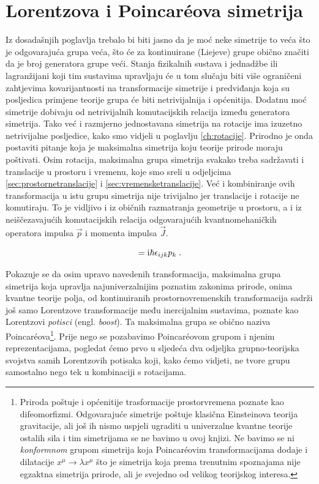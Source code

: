 
\chapter{Lorentzova i Poincar\'{e}ova simetrija}

Iz dosadašnjih poglavlja trebalo bi biti jasno da je moć
neke simetrije to veća što je odgovarajuća grupa veća, što
će za kontinuirane (Liejeve) grupe obično značiti da je broj generatora
grupe veći. Stanja fizikalnih sustava i jednadžbe ili lagranžijani
koji tim sustavima upravljaju
će u tom slučaju biti više ograničeni zahtjevima kovarijantnosti
na transformacije simetrije i predviđanja koja su posljedica
primjene teorije grupa će biti netrivijalnija i općenitija.
Dodatnu moć simetrije dobivaju od netrivijalnih komutacijskih
relacija između generatora simetrija.
Tako već i razmjerno jednostavana simetrija na rotacije ima izuzetno
netrivijalne posljedice, kako smo vidjeli u poglavlju \ref{ch:rotacije}.
Prirodno je onda postaviti pitanje koja je maksimalna
simetrija koju teorije prirode moraju poštivati. Osim rotacija,
maksimalna grupa simetrija svakako treba sadržavati i translacije
u prostoru i vremenu, koje smo sreli u odjeljcima
\ref{sec:prostornetranslacije} i \ref{sec:vremensketranslacije}.
Već i kombiniranje ovih transformacija u istu grupu simetrija
nije trivijalno jer translacije i rotacije ne komutiraju. To je
vidljivo i iz običnih razmatranja geometrije u prostoru, a i iz 
neiščezavajućih komutacijskih relacija odgovarajućih
kvantnomehaničkih operatora impulsa $\vec{p}$ i momenta
impulsa $\vec{J}$.

\begin{equation}
    [J_{i}, p_{j}] = \rmi \hbar \epsilon_{ijk} p_{k} \;.
    \label{eq:jpkomutacijske}
\end{equation}

Pokazuje se da osim upravo navedenih transformacija, maksimalna
grupa simetrija koja upravlja najuniverzalnijim poznatim zakonima
prirode, onima kvantne teorije polja, od kontinuiranih prostornovremenskih
transformacija sadrži još samo Lorentzove transformacije među inercijalnim sustavima,
poznate kao Lorentzovi \emph{potisci} (engl. \emph{boost}).
Ta maksimalna grupa se obično naziva Poincar\'{e}ova\footnote{Priroda poštuje
    i općenitije trasformacije prostorvremena poznate kao difeomorfizmi. 
    Odgovarajuće simetrije poštuje klasična Einsteinova teorija gravitacije, ali još
    ih nismo uspjeli ugraditi u univerzalne kvantne teorije ostalih sila i
    tim simetrijama se ne bavimo u ovoj knjizi. Ne bavimo se ni \emph{konformnom}
    grupom simetrija koja Poincar\'{e}ovim transformacijama dodaje i
    dilatacije $x^{\mu}\to\lambda x^{\mu}$ što je simetrija koja prema
    trenutnim spoznajama nije egzaktna simetrija prirode,
    ali je svejedno od velikog teorijskog interesa.}.
Prije nego se pozabavimo Poincar\'{e}ovom grupom i njenim reprezentacijama,
pogledat ćemo prvo u sljedeća dva odjeljka grupno-teorijska svojstva samih
Lorentzovih potisaka koji, kako ćemo vidjeti, ne tvore grupu samostalno
nego tek u kombinaciji s rotacijama.


